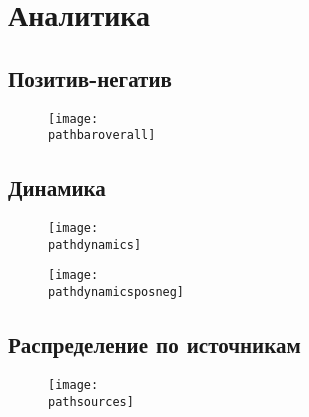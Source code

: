 
    \chapter{Аналитика}

        \section{Позитив-негатив}
        \newcommand{\pathbaroverall}{\VAR{bar_overall}}
        \begin{figure}[H]
            \centering\texttt{[image: \\pathbaroverall]}
        \end{figure}

    \section{Динамика}
    \newcommand{\pathdynamics}{\VAR{dynamics.dynamics}}
    \begin{figure}[H]
        \centering\texttt{[image: \\pathdynamics]}
    \end{figure}

        \newcommand{\pathdynamicsposneg}{\VAR{dynamics.dynamics_posneg}}
        \begin{figure}[H]
            \centering\texttt{[image: \\pathdynamicsposneg]}
        \end{figure}

    \section{Распределение по источникам}
    \newcommand{\pathsources}{\VAR{bar_source}}
    \begin{figure}[H]
        \centering\texttt{[image: \\pathsources]}
    \end{figure}


